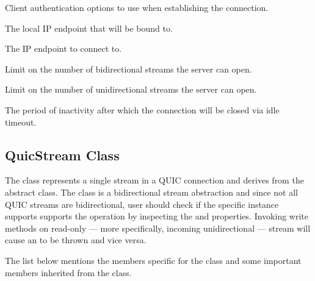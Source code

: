 \begin{description}

     Client
authentication options to use when establishing the connection.

     The local IP endpoint that will be bound
to.

     The IP endpoint to connect to.

     Limit on the number of
bidirectional streams the server can open.

     Limit on the number of
unidirectional streams the server can open.

     The period of inactivity after which the
connection will be closed via idle timeout.

\end{description}

\subsection{QuicStream Class}

The \QuicStream{} class represents a single stream in a QUIC connection and derives from the
abstract  class. The  class is a bidirectional stream abstraction and
since not all QUIC streams are bidirectional, user should check if the specific \QuicStream{}
instance supports supports the operation by inspecting the  and 
properties. Invoking write methods on read-only --- more specifically, incoming unidirectional ---
stream will cause an  to be thrown and vice versa.

The list below mentions the members specific for the  class and some important
members inherited from the  class.

